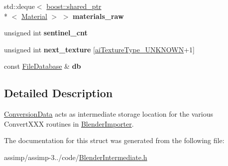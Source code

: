 \begin{DoxyCompactItemize}
\item 
\hypertarget{struct_assimp_1_1_blender_1_1_conversion_data_a1e32bedffc0b3f40a719caaf6f193e30}{std\+::deque$<$ \hyperlink{classboost_1_1shared__ptr}{boost\+::shared\+\_\+ptr}\\*
$<$ \hyperlink{struct_assimp_1_1_blender_1_1_material}{Material} $>$ $>$ {\bfseries materials\+\_\+raw}}\label{struct_assimp_1_1_blender_1_1_conversion_data_a1e32bedffc0b3f40a719caaf6f193e30}

\item 
\hypertarget{struct_assimp_1_1_blender_1_1_conversion_data_a8d9772a021e28bd1d969c51af3eee252}{unsigned int {\bfseries sentinel\+\_\+cnt}}\label{struct_assimp_1_1_blender_1_1_conversion_data_a8d9772a021e28bd1d969c51af3eee252}

\item 
\hypertarget{struct_assimp_1_1_blender_1_1_conversion_data_a81b79a754483b578bf5a6cd51716efd9}{unsigned int {\bfseries next\+\_\+texture} \mbox{[}\hyperlink{material_8h_a7dd415ff703a2cc53d1c22ddbbd7dde0a435cc5adea69c96c0c3205a2bde21cce}{ai\+Texture\+Type\+\_\+\+U\+N\+K\+N\+O\+W\+N}+1\mbox{]}}\label{struct_assimp_1_1_blender_1_1_conversion_data_a81b79a754483b578bf5a6cd51716efd9}

\item 
\hypertarget{struct_assimp_1_1_blender_1_1_conversion_data_a0681954d26e4e2ddc143ccad7c07f684}{const \hyperlink{class_assimp_1_1_blender_1_1_file_database}{File\+Database} \& {\bfseries db}}\label{struct_assimp_1_1_blender_1_1_conversion_data_a0681954d26e4e2ddc143ccad7c07f684}

\end{DoxyCompactItemize}


\subsection{Detailed Description}
\hyperlink{struct_assimp_1_1_blender_1_1_conversion_data}{Conversion\+Data} acts as intermediate storage location for the various Convert\+X\+X\+X routines in \hyperlink{class_assimp_1_1_blender_importer}{Blender\+Importer}. 

The documentation for this struct was generated from the following file\+:\begin{DoxyCompactItemize}
\item 
assimp/assimp-\/3../code/\hyperlink{_blender_intermediate_8h}{Blender\+Intermediate.\+h}\end{DoxyCompactItemize}

